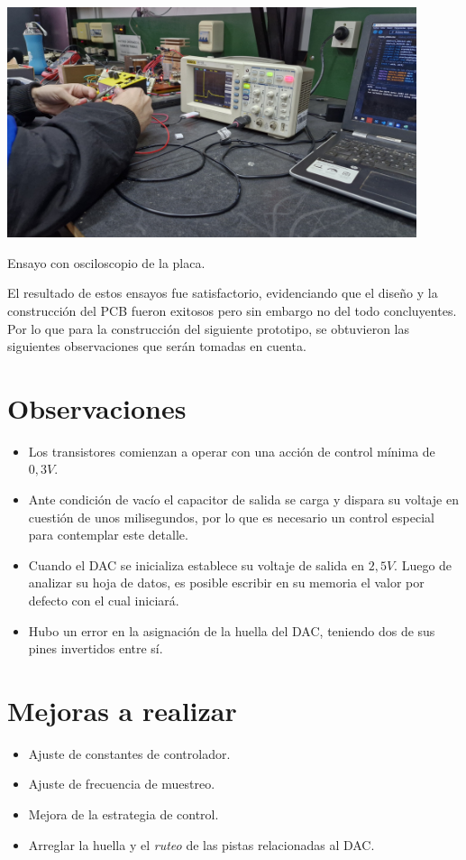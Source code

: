 \begin{foto}[H]
    \centering
    \includegraphics[width=0.9\textwidth]{./imagenes/fotos/osciloscopio.jpg}
    \caption{Ensayo con osciloscopio de la placa.}
    \label{F:esayos_y_pruebas}
\end{foto}\par 

El resultado de estos ensayos fue satisfactorio, evidenciando que el diseño y la construcción del PCB fueron exitosos pero sin embargo no del todo concluyentes. Por lo que para la construcción del siguiente prototipo, se obtuvieron las siguientes observaciones que serán tomadas en cuenta.  \par 
\section*{Observaciones}
\begin{itemize}
    \item Los transistores comienzan a operar con una acción de control mínima de $0,3V$.
    \item Ante condición de vacío el capacitor de salida se carga y dispara su voltaje en cuestión de unos milisegundos, por lo que es necesario un control especial para contemplar este detalle.
    \item Cuando el DAC se inicializa establece su voltaje de salida en $2,5V$. Luego de analizar su hoja de datos, es posible escribir en su memoria  el valor por defecto con el cual iniciará.
    \item Hubo un error en la asignación de la huella del DAC, teniendo dos de sus pines invertidos entre sí.
\end{itemize}

\section*{Mejoras a realizar}
\begin{itemize}
    \item Ajuste de constantes de controlador.
    \item Ajuste de frecuencia de muestreo.
    \item Mejora de la estrategia de control.
    \item Arreglar la huella y el \textit{ruteo} de las pistas relacionadas al DAC.
\end{itemize}

